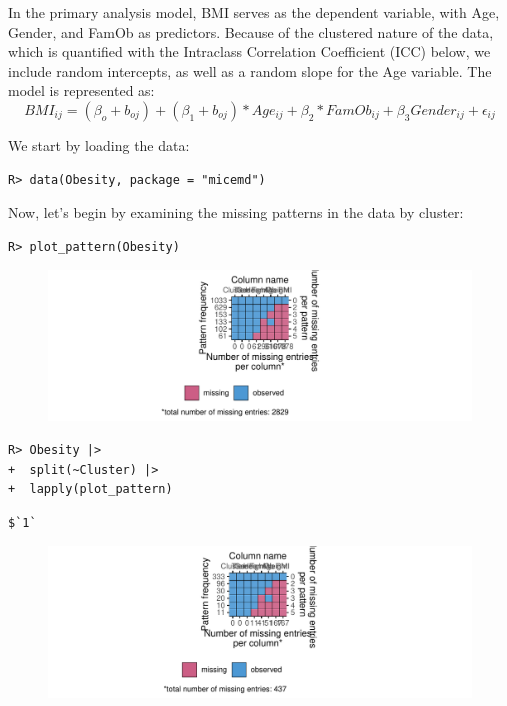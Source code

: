 \documentclass[
  article]{jss}
\begin{document}
In the primary analysis model, BMI serves as the dependent variable,
with Age, Gender, and FamOb as predictors. Because of the clustered
nature of the data, which is quantified with the Intraclass Correlation
Coefficient (ICC) below, we include random intercepts, as well as a
random slope for the Age variable. The model is represented as:
\begin{equation}
\label{eqn:main}
BMI_{ij}= (\beta_{o}+ b_{oj} ) + (\beta_{1}+ b_{oj})* Age_{ij} + \beta_{2}*FamOb_{ij}+ \beta_{3}Gender_{ij} + \epsilon_{ij}
\end{equation}

We start by loading the data:

\begin{verbatim}
R> data(Obesity, package = "micemd")
\end{verbatim}

Now, let's begin by examining the missing patterns in the data by
cluster:

\begin{verbatim}
R> plot_pattern(Obesity)
\end{verbatim}

\begin{figure}[h]

{\centering \includegraphics{manuscript_files/figure-pdf/unnamed-chunk-48-1.pdf}

}

\end{figure}

\begin{verbatim}
R> Obesity |> 
+  split(~Cluster) |>
+  lapply(plot_pattern)
\end{verbatim}

\begin{verbatim}
$`1`
\end{verbatim}

\begin{figure}[h]

{\centering \includegraphics{manuscript_files/figure-pdf/unnamed-chunk-49-1.pdf}

}

\end{figure}
\end{document}
